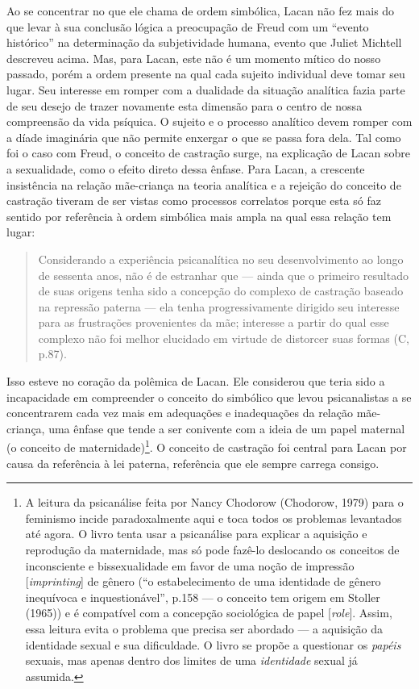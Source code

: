 Ao se concentrar no que ele chama de ordem simbólica, Lacan não fez mais
do que levar à sua conclusão lógica a preocupação de Freud com um
``evento histórico'' na determinação da subjetividade humana, evento que
Juliet Michtell descreveu acima. Mas, para Lacan, este não é um momento
mítico do nosso passado, porém a ordem presente na qual cada sujeito
individual deve tomar seu lugar. Seu interesse em romper com a dualidade
da situação analítica fazia parte de seu desejo de trazer novamente esta
dimensão para o centro de nossa compreensão da vida psíquica. O sujeito
e o processo analítico devem romper com a díade imaginária que não
permite enxergar o que se passa fora dela. Tal como foi o caso com
Freud, o conceito de castração surge, na explicação de Lacan sobre a
sexualidade, como o efeito direto dessa ênfase. Para Lacan, a crescente
insistência na relação mãe-criança na teoria analítica e a rejeição do
conceito de castração tiveram de ser vistas como processos correlatos
porque esta só faz sentido por referência à ordem simbólica mais ampla
na qual essa relação tem lugar:

\begin{quote}
Considerando a experiência psicanalítica no seu desenvolvimento ao longo
de sessenta anos, não é de estranhar que --- ainda que o primeiro
resultado de suas origens tenha sido a concepção do complexo de
castração baseado na repressão paterna --- ela tenha progressivamente
dirigido seu interesse para as frustrações provenientes da mãe;
interesse a partir do qual esse complexo não foi melhor elucidado em
virtude de distorcer suas formas (C, p.87).
\end{quote}

Isso esteve no coração da polêmica de Lacan. Ele considerou que teria
sido a incapacidade em compreender o conceito do simbólico que levou
psicanalistas a se concentrarem cada vez mais em adequações e
inadequações da relação mãe-criança, uma ênfase que tende a ser
conivente com a ideia de um papel maternal (o conceito de
maternidade)\footnote{A leitura da psicanálise feita por Nancy Chodorow
  (Chodorow, 1979) para o feminismo incide paradoxalmente aqui e toca
  todos os problemas levantados até agora. O livro tenta usar a
  psicanálise para explicar a aquisição e reprodução da maternidade, mas
  só pode fazê-lo deslocando os conceitos de inconsciente e
  bissexualidade em favor de uma noção de impressão
  {[}\emph{imprinting}{]} de gênero (``o estabelecimento de uma
  identidade de gênero inequívoca e inquestionável'', p.158 --- o
  conceito tem origem em Stoller (1965)) e é compatível com a concepção
  sociológica de papel {[}\emph{role}{]}. Assim, essa leitura evita o
  problema que precisa ser abordado --- a aquisição da identidade sexual
  e sua dificuldade. O livro se propõe a questionar os \emph{papéis}
  sexuais, mas apenas dentro dos limites de uma \emph{identidade} sexual
  já assumida.}. O conceito de castração foi central para Lacan por
causa da referência à lei paterna, referência que ele sempre carrega
consigo.

